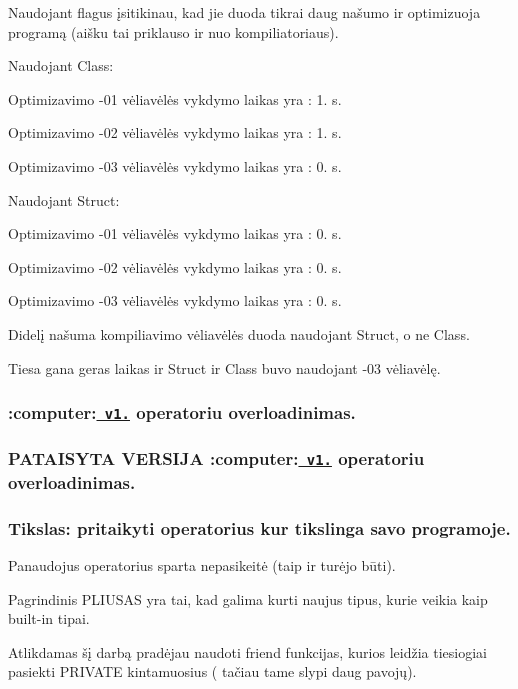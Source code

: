 Naudojant flagus įsitikinau, kad jie duoda tikrai daug našumo ir optimizuoja programą (aišku tai priklauso ir nuo kompiliatoriaus).

Naudojant Class\+:

Optimizavimo -\/01 vėliavėlės vykdymo laikas yra \+: 1. s.

Optimizavimo -\/02 vėliavėlės vykdymo laikas yra \+: 1. s.

Optimizavimo -\/03 vėliavėlės vykdymo laikas yra \+: 0. s.

Naudojant Struct\+:

Optimizavimo -\/01 vėliavėlės vykdymo laikas yra \+: 0. s.

Optimizavimo -\/02 vėliavėlės vykdymo laikas yra \+: 0. s.

Optimizavimo -\/03 vėliavėlės vykdymo laikas yra \+: 0. s.

Didelį našuma kompiliavimo vėliavėlės duoda naudojant Struct, o ne Class.

Tiesa gana geras laikas ir Struct ir Class buvo naudojant -\/03 vėliavėlę.





\subsubsection*{\+:computer\+:\href{https://github.com/odiraitis/TRECIASND/releases/tag/v1.2}{\texttt{ v1.}} operatoriu overloadinimas.}

\subsubsection*{P\+A\+T\+A\+I\+S\+Y\+TA V\+E\+R\+S\+I\+JA \+:computer\+:\href{https://github.com/odiraitis/TRECIASND/releases/tag/v1.21}{\texttt{ v1.}} operatoriu overloadinimas.}

\subsubsection*{Tikslas\+: pritaikyti operatorius kur tikslinga savo programoje.}

Panaudojus operatorius sparta nepasikeitė (taip ir turėjo būti).

Pagrindinis P\+L\+I\+U\+S\+AS yra tai, kad galima kurti naujus tipus, kurie veikia kaip built-\/in tipai.

Atlikdamas šį darbą pradėjau naudoti friend funkcijas, kurios leidžia tiesiogiai pasiekti P\+R\+I\+V\+A\+TE kintamuosius ( tačiau tame slypi daug pavojų).

